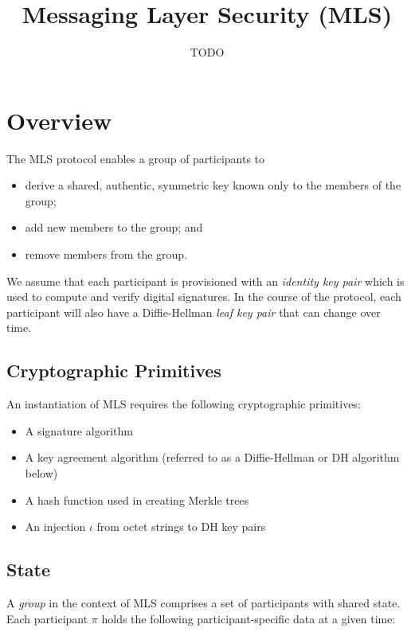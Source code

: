 \documentclass[11pt, oneside]{article}
\title{Messaging Layer Security (MLS)}
\author{TODO}
\newcommand{\protoname}{MLS\xspace}
\begin{document}
\maketitle

\section{Overview}

The \protoname protocol enables a group of participants to

\begin{itemize}
\item derive a shared, authentic, symmetric key known only to the members of the group;
\item add new members to the group; and
\item remove members from the group.
\end{itemize}

We assume that each participant is provisioned with an \emph{identity key pair} which is used to compute and verify digital signatures.  In the course of the protocol, each participant will also have a Diffie-Hellman \emph{leaf key pair} that can change over time.

\subsection{Cryptographic Primitives}

An instantiation of \protoname requires the following cryptographic primitives:

\begin{itemize}
\item{A signature algorithm}
\item{A key agreement algorithm (referred to as a Diffie-Hellman or DH algorithm below)}
\item{A hash function used in creating Merkle trees}
\item{An injection $\iota$ from octet strings to DH key pairs}
\end{itemize}

\subsection{State}

A \emph{group} in the context of \protoname comprises a set of participants with shared state.  Each participant $\pi$ holds the following participant-specific data at a given time:
\end{document}
